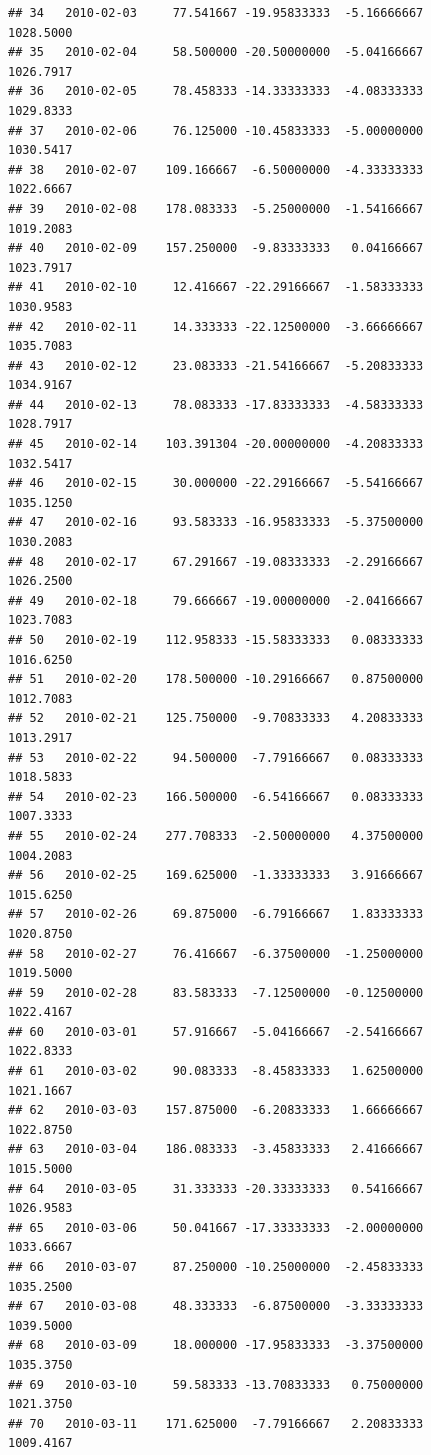 \documentclass[
]{article}
\begin{document}
\begin{verbatim}
## 34   2010-02-03     77.541667 -19.95833333  -5.16666667    1028.5000
## 35   2010-02-04     58.500000 -20.50000000  -5.04166667    1026.7917
## 36   2010-02-05     78.458333 -14.33333333  -4.08333333    1029.8333
## 37   2010-02-06     76.125000 -10.45833333  -5.00000000    1030.5417
## 38   2010-02-07    109.166667  -6.50000000  -4.33333333    1022.6667
## 39   2010-02-08    178.083333  -5.25000000  -1.54166667    1019.2083
## 40   2010-02-09    157.250000  -9.83333333   0.04166667    1023.7917
## 41   2010-02-10     12.416667 -22.29166667  -1.58333333    1030.9583
## 42   2010-02-11     14.333333 -22.12500000  -3.66666667    1035.7083
## 43   2010-02-12     23.083333 -21.54166667  -5.20833333    1034.9167
## 44   2010-02-13     78.083333 -17.83333333  -4.58333333    1028.7917
## 45   2010-02-14    103.391304 -20.00000000  -4.20833333    1032.5417
## 46   2010-02-15     30.000000 -22.29166667  -5.54166667    1035.1250
## 47   2010-02-16     93.583333 -16.95833333  -5.37500000    1030.2083
## 48   2010-02-17     67.291667 -19.08333333  -2.29166667    1026.2500
## 49   2010-02-18     79.666667 -19.00000000  -2.04166667    1023.7083
## 50   2010-02-19    112.958333 -15.58333333   0.08333333    1016.6250
## 51   2010-02-20    178.500000 -10.29166667   0.87500000    1012.7083
## 52   2010-02-21    125.750000  -9.70833333   4.20833333    1013.2917
## 53   2010-02-22     94.500000  -7.79166667   0.08333333    1018.5833
## 54   2010-02-23    166.500000  -6.54166667   0.08333333    1007.3333
## 55   2010-02-24    277.708333  -2.50000000   4.37500000    1004.2083
## 56   2010-02-25    169.625000  -1.33333333   3.91666667    1015.6250
## 57   2010-02-26     69.875000  -6.79166667   1.83333333    1020.8750
## 58   2010-02-27     76.416667  -6.37500000  -1.25000000    1019.5000
## 59   2010-02-28     83.583333  -7.12500000  -0.12500000    1022.4167
## 60   2010-03-01     57.916667  -5.04166667  -2.54166667    1022.8333
## 61   2010-03-02     90.083333  -8.45833333   1.62500000    1021.1667
## 62   2010-03-03    157.875000  -6.20833333   1.66666667    1022.8750
## 63   2010-03-04    186.083333  -3.45833333   2.41666667    1015.5000
## 64   2010-03-05     31.333333 -20.33333333   0.54166667    1026.9583
## 65   2010-03-06     50.041667 -17.33333333  -2.00000000    1033.6667
## 66   2010-03-07     87.250000 -10.25000000  -2.45833333    1035.2500
## 67   2010-03-08     48.333333  -6.87500000  -3.33333333    1039.5000
## 68   2010-03-09     18.000000 -17.95833333  -3.37500000    1035.3750
## 69   2010-03-10     59.583333 -13.70833333   0.75000000    1021.3750
## 70   2010-03-11    171.625000  -7.79166667   2.20833333    1009.4167

\end{verbatim}
\end{document}
